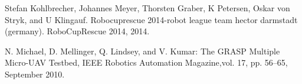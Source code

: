 \documentclass{styles/svproc}
\begin{document}
\begin{thebibliography}{6}
  Stefan Kohlbrecher, Johannes Meyer, Thorsten Graber, K Petersen, Oskar von Stryk, and U Klingauf. 
  Robocuprescue 2014-robot league team hector darmstadt (germany). 
  RoboCupRescue 2014, 2014.

  N. Michael, D. Mellinger, Q. Lindsey, and V. Kumar:
  The GRASP Multiple Micro-UAV Testbed, 
  IEEE Robotics Automation Magazine,vol. 17, pp. 56–65, September 2010.
\end{thebibliography}

        
\end{document}
